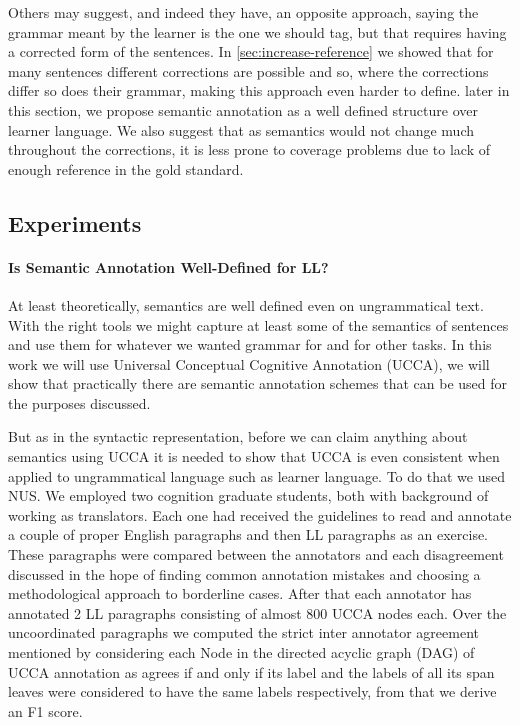 \documentclass[english]{article}
\begin{document}
Others may suggest, and indeed they have\cite{nagataphrase}, an opposite
approach, saying the grammar meant by the learner is the one we should
tag, but that requires having a corrected form of the sentences.
In \ref{sec:increase-reference} we showed that for many sentences different
corrections are possible and so, where the corrections differ so does their grammar,
making this approach even harder to define. later in this
section, we propose semantic annotation as a well defined structure over learner language. We also suggest that as semantics would not change much throughout the corrections, it is less prone to coverage problems due to lack of enough reference in the gold standard.

\subsection{Experiments}


\paragraph{Is Semantic Annotation Well-Defined for LL?}

At least theoretically, semantics are well defined even on ungrammatical
text. With the right tools we might capture at least some of the semantics
of sentences and use them for whatever we wanted grammar for and for
other tasks. In this work we will use Universal Conceptual Cognitive
Annotation (UCCA)\cite{abend2013universal}, we will show that practically
there are semantic annotation schemes that can be used for the purposes
discussed.

But as in the syntactic representation, before we can claim anything
about semantics using UCCA it is needed to show that UCCA is even
consistent when applied to ungrammatical language such as learner
language. To do that we used NUS\cite{dahlmeier2013building}.
We employed two cognition graduate students, both
with background of working as translators. Each
one had received the guidelines to read and annotate a couple of
proper English paragraphs and then LL paragraphs as
an exercise. These paragraphs were compared between the annotators
and each disagreement discussed in the hope of finding common annotation
mistakes and choosing a methodological approach to borderline cases.
After that each annotator has annotated 2 LL paragraphs
consisting of almost 800 UCCA nodes each. Over the uncoordinated paragraphs
we computed the strict inter annotator agreement mentioned by \cite{abend2013universal}
considering each Node in the directed acyclic graph (DAG) of UCCA
annotation as agrees if and only if its label and the labels of all
its span leaves were considered to have the same labels respectively,
from that we derive an F1 score. 
\end{document}
